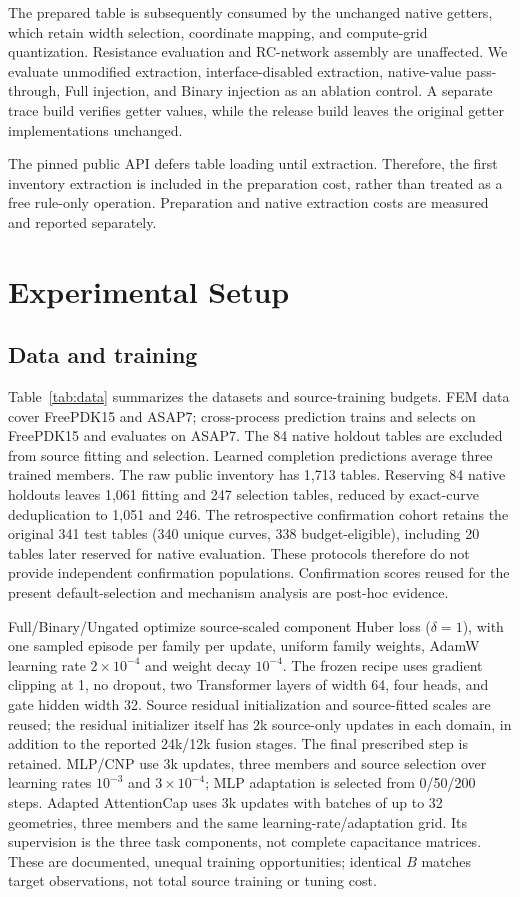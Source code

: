\documentclass[conference,9pt,letterpaper]{IEEEtran}
\begin{document}
The prepared table is subsequently consumed by
the unchanged native getters, which retain
width selection, coordinate mapping, and
compute-grid quantization. Resistance evaluation
and RC-network assembly are unaffected.
We evaluate unmodified extraction, interface-disabled
extraction, native-value pass-through, Full
injection, and Binary injection as an ablation control. A separate trace
build verifies getter values, while the release
build leaves the original getter implementations
unchanged.

The pinned public API defers table loading until
extraction. Therefore, the first inventory
extraction is included in the preparation cost,
rather than treated as a free rule-only operation.
Preparation and native extraction costs are
measured and reported separately.


\section{Experimental Setup}
\subsection{Data and training}
Table~\ref{tab:data} summarizes the datasets and source-training budgets. FEM data cover FreePDK15 and ASAP7; cross-process prediction trains and selects on FreePDK15 and evaluates on ASAP7. The 84 native holdout tables are excluded from source fitting and selection. Learned completion predictions average three trained members.
The raw public inventory has 1,713 tables. Reserving 84 native holdouts
leaves 1,061 fitting and 247 selection tables, reduced by exact-curve
deduplication to 1,051 and 246. The retrospective confirmation cohort
retains the original 341 test tables (340 unique curves, 338 budget-eligible),
including 20 tables later reserved for native evaluation. These protocols
therefore do not provide independent confirmation populations. Confirmation scores reused for the present
default-selection and mechanism analysis are post-hoc evidence.

Full/Binary/Ungated optimize source-scaled component Huber loss
($\delta=1$), with one sampled episode per family per update, uniform
family weights, AdamW learning rate $2\times10^{-4}$ and weight decay
$10^{-4}$. The frozen recipe uses gradient clipping at 1, no dropout,
two Transformer layers of width 64, four heads, and gate hidden width 32.
Source residual initialization and source-fitted scales are reused;
the residual initializer itself has 2k source-only updates in each domain,
in addition to the reported 24k/12k fusion stages. The final prescribed
step is retained. MLP/CNP use 3k updates, three
members and source selection over learning rates $10^{-3}$ and
$3\times10^{-4}$; MLP adaptation is selected from 0/50/200 steps.
Adapted AttentionCap uses 3k updates with batches of up to 32 geometries,
three members and the same learning-rate/adaptation grid. Its supervision
is the three task components, not complete capacitance matrices. These
are documented, unequal training opportunities; identical $B$ matches
target observations, not total source training or tuning cost.
\end{document}
